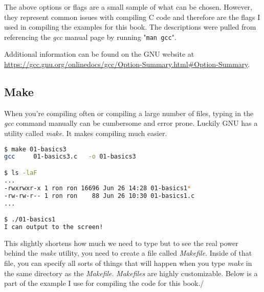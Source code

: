 \documentclass[../main.tex]{subfiles}
\begin{document}
The above options or flags are a small sample of what can be chosen.  However, they represent common issues with compiling C code and therefore are the flags I used in compiling the examples for this book.  The descriptions were pulled from referencing the \textit{gcc} manual page by running "\texttt{man gcc}".

Additional information can be found on the GNU website at \href{https://gcc.gnu.org/onlinedocs/gcc/Option-Summary.html\#Option-Summary}{https://gcc.gnu.org/onlinedocs/gcc/Option-Summary.html\#Option-Summary}.


\subsection{Make}

When you're compiling often or compiling a large number of files, typing in the \textit{gcc} command manually can be cumbersome and error prone.  Luckily GNU has a utility called \textit{make}.  It makes compiling much easier.\\

\begin{lstlisting}[language=bash, numbers=none]
$ make 01-basics3
gcc     01-basics3.c   -o 01-basics3

$ ls -laF
...
-rwxrwxr-x 1 ron ron 16696 Jun 26 14:28 01-basics1*
-rw-rw-r-- 1 ron ron    88 Jun 26 10:30 01-basics1.c
...

$ ./01-basics1 
I can output to the screen!
\end{lstlisting}

This slightly shortens how much we need to type but to see the real power behind the \textit{make} utility, you need to create a file called \textit{Makefile}.  Inside of that file, you can specify all sorts of things that will happen when you type \textit{make} in the same directory as the \textit{Makefile}.  \textit{Makefiles} are highly customizable.  Below is a part of the example I use for compiling the code for this book./\\


\end{document}
